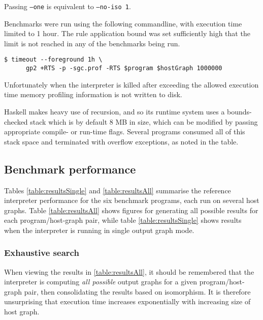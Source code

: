 Passing \texttt{--one} is equivalent to \texttt{--no-iso 1}.


Benchmarks were run using the following commandline, with execution time limited to 1 hour. The rule application bound was set sufficiently high that the limit is not reached in any of the benchmarks being run.

\begin{verbatim}
$ timeout --foreground 1h \
      gp2 +RTS -p -sgc.prof -RTS $program $hostGraph 1000000
\end{verbatim}

Unfortunately when the interpreter is killed after exceeding the allowed execution time memory profiling information is not written to disk.



Haskell makes heavy use of recursion, and so its runtime system uses a bounds-checked stack which is by default 8 MB in size, which can be modified by passing appropriate compile- or run-time flags. Several programs consumed all of this stack space and terminated with overflow exceptions, as noted in the table. %





\subsection{Benchmark performance}

Tables \ref{table:resultsSingle} and \ref{table:resultsAll} summarise the reference interpreter performance for the six benchmark programs, each run on several host graphs. Table \ref{table:resultsAll} shows figures for generating all possible results for each program/host-graph pair, while table \ref{table:resultsSingle} shows results when the interpreter is running in single output graph mode.





\subsubsection*{Exhaustive search}

When viewing the results in \ref{table:resultsAll}, it should be remembered that the interpreter is computing \textit{all possible} output graphs for a given program/host-graph pair, then consolidating the results based on isomorphism. It is therefore unsurprising that execution time increases exponentially with increasing size of host graph.

